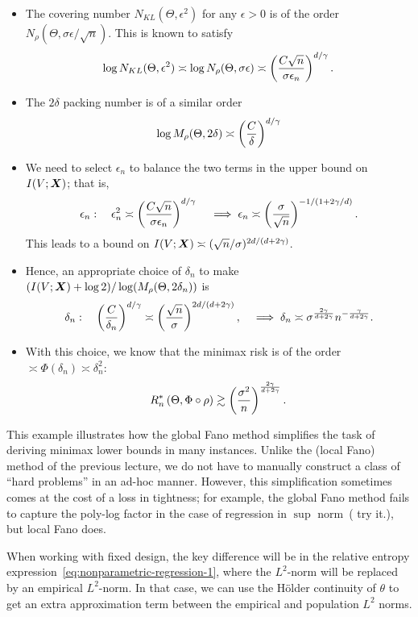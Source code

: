 \documentclass[12pt]{article}
\begin{document}
\begin{itemize}
	\item The covering number $N_{KL}(\Theta, \epsilon^2)$ for any $\epsilon>0$ is of the order $N_\rho(\Theta, \sigma \epsilon/\sqrt{n})$. This is known to satisfy 
	\begin{align}
		\log N_{KL}(\Theta, \epsilon^2) \asymp \log N_\rho(\Theta, \sigma \epsilon) \asymp \left( \frac{C \sqrt{n}}{\sigma \epsilon_n} \right)^{d/\gamma}. 
	\end{align}
	\item The $2\delta$ packing number is of a similar order 
	\begin{align}
		\log M_\rho(\Theta, 2\delta) \asymp \left( \frac{C}{\delta} \right)^{d/\gamma}
	\end{align}
	\item We need to select $\epsilon_n$ to balance the two terms in the upper bound on $I(V; {\boldsymbol X})$; that is, 
	\begin{align}
		\epsilon_n: \quad \epsilon_n^2 \asymp \left( \frac{C \sqrt{n}}{\sigma \epsilon_n} \right)^{d/\gamma} \quad \implies \epsilon_n \asymp \left( \frac{\sigma}{\sqrt{n}} \right)^{-1/(1 + 2\gamma/d)}. 
	\end{align}
	This leads to a bound on $I(V; {\boldsymbol X}) \asymp (\sqrt{n}/\sigma)^{2d/(d + 2\gamma)}$. 
	\item Hence, an appropriate choice of $\delta_n$ to make $(I(V;{\boldsymbol X}) + \log 2)/\log(M_\rho(\Theta, 2\delta_n))$ is 
	\begin{align}
		\delta_n: \quad \left( \frac{C}{\delta_n} \right)^{d/\gamma} \asymp \left( \frac{\sqrt{n}}{\sigma}\right)^{2d/(d+2\gamma)}, \quad \implies \delta_n \asymp \sigma^{\frac{2\gamma}{d+2\gamma}} n^{-{\frac{\gamma}{d+2\gamma}}}. 
	\end{align}
	\item With this choice, we know that the minimax risk is of the order $\asymp \Phi(\delta_n) \asymp \delta_n^2$: 
	\begin{align}
		R_n^*\left( \Theta, \Phi \circ \rho \right) \gtrsim \left( \frac{\sigma^2}{n} \right)^{\frac{2\gamma}{d + 2\gamma}}. 
	\end{align} 
\end{itemize}
This example illustrates how the global Fano method simplifies the task of deriving minimax lower bounds  in many instances. Unlike the (local Fano) method of the previous lecture, we do not have to manually construct a class of ``hard problems'' in an ad-hoc manner. However, this simplification sometimes comes at the cost of a loss in tightness; for example, the global Fano method fails to capture the poly-log factor in the case of regression in $\sup$ norm~( try it.), but local Fano does. 

\begin{remark}
	\label{remark:}
	When working with fixed design, the key difference will be in the relative entropy expression~\eqref{eq:nonparametric-regression-1}, where the $L^2$-norm will be replaced by an empirical $L^2$-norm. In that case, we can use the H\"older continuity of $\theta$ to get an extra approximation term between the empirical and population $L^2$ norms. 
\end{remark}
\end{document}
